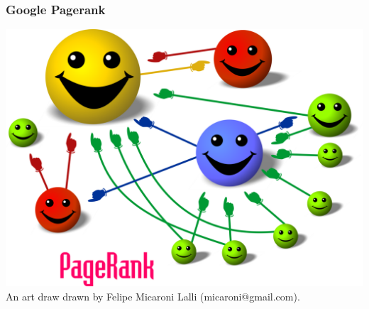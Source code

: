 \documentclass{beamer}
\begin{document}
\begin{frame}
  \frametitle{Google Pagerank}
  \includegraphics[width=\linewidth]{pagerank.png}\\
  \tiny
  An art draw drawn by Felipe Micaroni Lalli (micaroni@gmail.com).
\end{frame}
\end{document}
